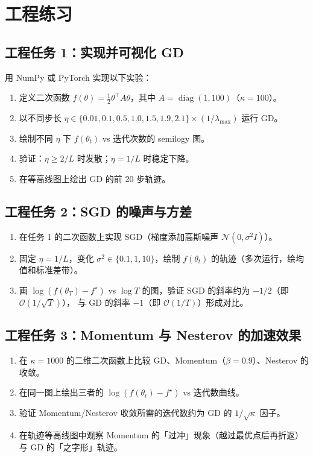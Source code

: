 \documentclass[12pt,a4paper]{ctexart}
\theoremstyle{definition}
\theoremstyle{plain}
\newcommand{\diag}{\operatorname{diag}}
\begin{document}
\section{工程练习}

\subsection*{工程任务 1：实现并可视化 GD}

用 NumPy 或 PyTorch 实现以下实验：
\begin{enumerate}[label=(\arabic*)]
  \item 定义二次函数 $f(\theta) = \frac12\theta^\top A\theta$，其中 $A = \diag(1, 100)$（$\kappa = 100$）。
  \item 以不同步长 $\eta \in \{0.01, 0.1, 0.5, 1.0, 1.5, 1.9, 2.1\} \times (1/\lambda_{\max})$ 运行 GD。
  \item 绘制不同 $\eta$ 下 $f(\theta_t)$ vs 迭代次数的 semilogy 图。
  \item 验证：$\eta \ge 2/L$ 时发散；$\eta = 1/L$ 时稳定下降。
  \item 在等高线图上绘出 GD 的前 20 步轨迹。
\end{enumerate}

\subsection*{工程任务 2：SGD 的噪声与方差}

\begin{enumerate}[label=(\arabic*)]
  \item 在任务 1 的二次函数上实现 SGD（梯度添加高斯噪声 $\mathcal{N}(0, \sigma^2 I)$）。
  \item 固定 $\eta = 1/L$，变化 $\sigma^2 \in \{0.1, 1, 10\}$，绘制 $f(\theta_t)$ 的轨迹（多次运行，绘均值和标准差带）。
  \item 画 $\log(f(\theta_T) - f^\star)$ vs $\log T$ 的图，验证 SGD 的斜率约为 $-1/2$（即 $\mathcal{O}(1/\sqrt{T})$），
  与 GD 的斜率 $-1$（即 $\mathcal{O}(1/T)$）形成对比。
\end{enumerate}

\subsection*{工程任务 3：Momentum 与 Nesterov 的加速效果}

\begin{enumerate}[label=(\arabic*)]
  \item 在 $\kappa = 1000$ 的二维二次函数上比较 GD、Momentum（$\beta = 0.9$）、Nesterov 的收敛。
  \item 在同一图上绘出三者的 $\log(f(\theta_t) - f^\star)$ vs 迭代数曲线。
  \item 验证 Momentum/Nesterov 收敛所需的迭代数约为 GD 的 $1/\sqrt{\kappa}$ 因子。
  \item 在轨迹等高线图中观察 Momentum 的「过冲」现象（越过最优点后再折返）与 GD 的「之字形」轨迹。
\end{enumerate}
\end{document}
